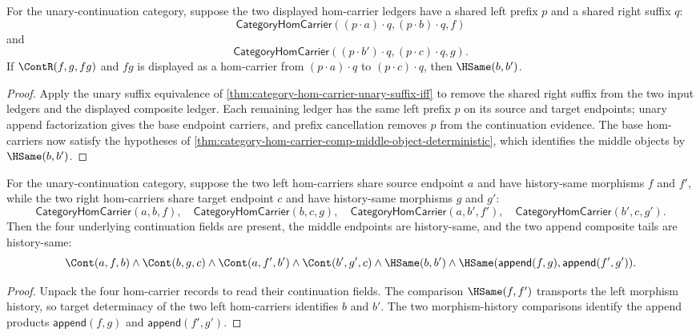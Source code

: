 \begin{theorem}
\label{thm:category-hom-carrier-unary-context-comp-middle-object-deterministic}
For the unary-continuation category, suppose the two displayed hom-carrier
ledgers have a shared left prefix $p$ and a shared right suffix $q$:
$$
\mathsf{CategoryHomCarrier}((p\cdot a)\cdot q,(p\cdot b)\cdot q,f)
$$
and
$$
\mathsf{CategoryHomCarrier}((p\cdot b')\cdot q,(p\cdot c)\cdot q,g).
$$
If $\ContR(f,g,fg)$ and $fg$ is displayed as a hom-carrier from
$(p\cdot a)\cdot q$ to $(p\cdot c)\cdot q$, then $\HSame(b,b')$.
\end{theorem}
\begin{proof}
Apply the unary suffix equivalence of
\autoref{thm:category-hom-carrier-unary-suffix-iff} to remove the shared
right suffix from the two input ledgers and the displayed composite ledger.
Each remaining ledger has the same left prefix $p$ on its source and target
endpoints; unary append factorization gives the base endpoint carriers, and
prefix cancellation removes $p$ from the continuation evidence. The base
hom-carriers now satisfy the hypotheses of
\autoref{thm:category-hom-carrier-comp-middle-object-deterministic}, which
identifies the middle objects by $\HSame(b,b')$.
\end{proof}

\begin{theorem}
\label{thm:category-hom-carrier-parallel-factor-comp-tail-middle-deterministic}
For the unary-continuation category, suppose the two left hom-carriers share
source endpoint $a$ and have history-same morphisms $f$ and $f'$, while the two
right hom-carriers share target endpoint $c$ and have history-same morphisms
$g$ and $g'$:
$$
\mathsf{CategoryHomCarrier}(a,b,f),\quad
\mathsf{CategoryHomCarrier}(b,c,g),\quad
\mathsf{CategoryHomCarrier}(a,b',f'),\quad
\mathsf{CategoryHomCarrier}(b',c,g').
$$
Then the four underlying continuation fields are present, the middle endpoints
are history-same, and the two append composite tails are history-same:
$$
\Cont(a,f,b)\wedge\Cont(b,g,c)\wedge\Cont(a,f',b')\wedge\Cont(b',g',c)
\wedge\HSame(b,b')\wedge\HSame(\mathsf{append}(f,g),\mathsf{append}(f',g')).
$$
\end{theorem}
\begin{proof}
Unpack the four hom-carrier records to read their continuation fields. The
comparison $\HSame(f,f')$ transports the left morphism history, so target
determinacy of the two left hom-carriers identifies $b$ and $b'$. The two
morphism-history comparisons identify the append products
$\mathsf{append}(f,g)$ and $\mathsf{append}(f',g')$.
\end{proof}

